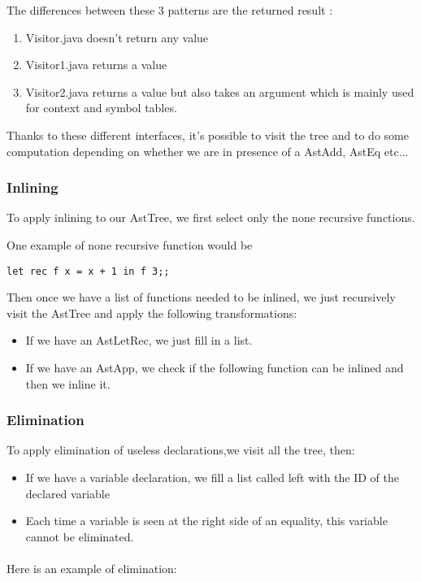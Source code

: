 \documentclass[a4paper,10pt]{article}
\begin{document}
The differences between these 3 patterns are the returned result :
\begin{enumerate}
\item Visitor.java doesn't return any value
\item Visitor1.java returns a value 
\item Visitor2.java returns a value but also takes an argument which is mainly used for context and symbol tables. 
\end{enumerate}

Thanks to these different interfaces, it's possible to visit the tree and to do some computation depending on whether we are in presence of a AstAdd, AstEq etc...

\subsubsection{Inlining}

To apply inlining to our AstTree, we first select only the none recursive functions. 


One example of none recursive function would be
\begin{lstlisting}[language=caml]
	let rec f x = x + 1 in f 3;;
\end{lstlisting}

Then once we have a list of functions needed to be inlined, we just recursively visit the AstTree and apply the following transformations: 
\begin{itemize}
\item If we have an AstLetRec, we just fill in a list.
\item If we have an AstApp, we check if the following function can be inlined and then we inline it.
\end{itemize}


\subsubsection{Elimination}
To apply elimination of useless declarations,we visit all the tree, then:
\begin{itemize}
\item If we have a variable declaration, we fill a list called left with the ID of the declared variable
\item Each time a variable is seen at the right side of an equality, this variable cannot be eliminated.
\end{itemize}

\paragraph{}
Here is an example of elimination:
\end{document}
